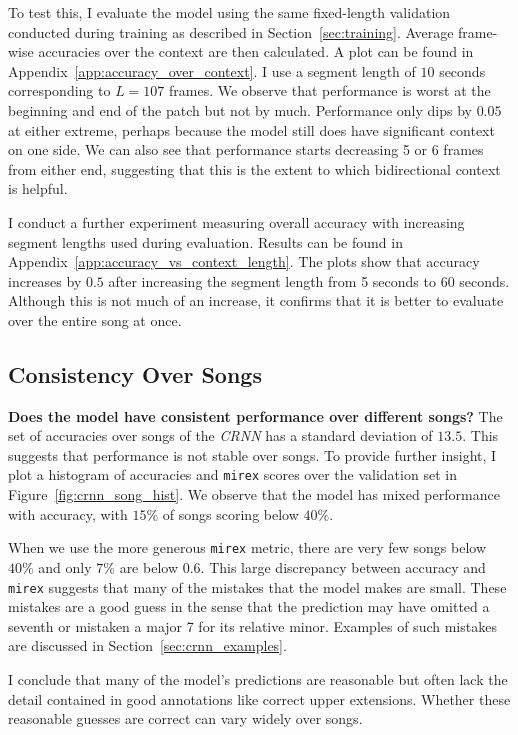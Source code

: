 To test this, I evaluate the model using the same fixed-length validation conducted during training as described in Section~\ref{sec:training}. Average frame-wise accuracies over the context are then calculated. A plot can be found in Appendix~\ref{app:accuracy_over_context}. I use a segment length of $10$ seconds corresponding to $L=107$ frames. We observe that performance is worst at the beginning and end of the patch but not by much. Performance only dips by $0.05$ at either extreme, perhaps because the model still does have significant context on one side. We can also see that performance starts decreasing 5 or 6 frames from either end, suggesting that this is the extent to which bidirectional context is helpful.

I conduct a further experiment measuring overall accuracy with increasing segment lengths used during evaluation. Results can be found in Appendix~\ref{app:accuracy_vs_context_length}. The plots show that accuracy increases by $0.5$ after increasing the segment length from 5 seconds to 60 seconds. Although this is not much of an increase, it confirms that it is better to evaluate over the entire song at once.

\subsection{Consistency Over Songs}

\textbf{Does the model have consistent performance over different songs?} The set of accuracies over songs of the \emph{CRNN} has a standard deviation of $13.5$. This suggests that performance is not stable over songs. To provide further insight, I plot a histogram of accuracies and \texttt{mirex} scores over the validation set in Figure~\ref{fig:crnn_song_hist}. We observe that the model has mixed performance with accuracy, with $15\%$ of songs scoring below $40\%$.  

When we use the more generous \texttt{mirex} metric, there are very few songs below $40\%$ and only $7\%$ are below $0.6$. This large discrepancy between accuracy and \texttt{mirex} suggests that many of the mistakes that the model makes are small. These mistakes are a good guess in the sense that the prediction may have omitted a seventh or mistaken a major 7 for its relative minor. Examples of such mistakes are discussed in Section~\ref{sec:crnn_examples}. 

I conclude that many of the model's predictions are reasonable but often lack the detail contained in good annotations like correct upper extensions. Whether these reasonable guesses are correct can vary widely over songs.


